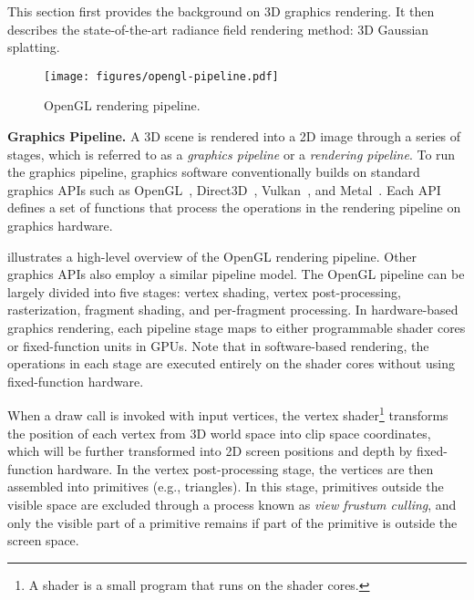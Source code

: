 
This section first provides the background on 3D graphics rendering. It then
describes the state-of-the-art radiance field rendering method: 3D Gaussian
splatting.

\begin{figure}[t]
  \centering
  \texttt{[image: figures/opengl-pipeline.pdf]}
  \caption{OpenGL rendering pipeline.}
  \vspace{-0.20in}
  \label{fig:opengl-pipeline}
\end{figure}


\noindent \textbf{Graphics Pipeline.}
%
A 3D scene is rendered into a 2D image through a series of stages, which is
referred to as a \emph{graphics pipeline} or a \emph{rendering pipeline}.
%
To run the graphics pipeline, graphics software conventionally builds on
standard graphics APIs such as OpenGL~\cite{opengl}, Direct3D~\cite{d3d},
Vulkan~\cite{vulkan}, and Metal~\cite{metal}. Each API defines a set of
functions that process the operations in the rendering pipeline on graphics
hardware. 

 illustrates a high-level overview of the OpenGL
rendering pipeline. Other graphics APIs also employ a similar pipeline model.
%
The OpenGL pipeline can be largely divided into five stages: vertex shading,
vertex post-processing, rasterization, fragment shading, and per-fragment
processing. 
%
In hardware-based graphics rendering, each pipeline stage maps to either
programmable shader cores or fixed-function units in GPUs. 
%
Note that in software-based rendering, the operations in each stage are
executed entirely on the shader cores without using fixed-function hardware.

When a draw call is invoked with input vertices, the vertex shader\footnote{A
shader is a small program that runs on the shader cores.} transforms the
position of each vertex from 3D world space into clip space coordinates, which
will be further transformed into 2D screen positions and depth by
fixed-function hardware.
%
In the vertex post-processing stage, the vertices are then assembled into
primitives (e.g., triangles). In this stage, primitives outside the visible
space are excluded through a process known as \emph{view frustum culling},
and only the visible part of a primitive remains if part of the primitive is
outside the screen space.

